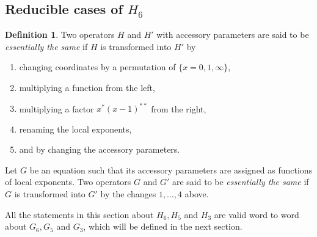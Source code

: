 \documentclass[a4paper,12pt]{article}
\theoremstyle{definition}
\newtheorem{dfn}[thm]{Definition}
\theoremstyle{remark}
\numberwithin{equation}{section} %
\newcommand{\blue}[1]{\textcolor{black}{#1}}
\begin{document}
\subsection{Reducible cases of $H_6$}
\begin{dfn}
  Two operators $H$ and $H'$ with accessory parameters are said to be {\it essentially the same} if $H$ is transformed into $H'$ by
  \begin{enumerate}
  \item changing coordinates by a permutation of $\{x=0,1,\infty\}$,
  \item multiplying a function from the left,
  \item multiplying a factor  $x^*(x-1)^{**}$ from the right,
  \item renaming the local exponents,%
    \item and by changing the accessory parameters.
  \end{enumerate}%
  Let $G$ be an equation such that its accessory parameters are assigned as functions of local exponents. Two operators $G$ and $G'$ are said to be {\it essentially the same} if $G$ is transformed into $G'$ by the changes $1,\dots,4$ above.%
\end{dfn}
All the statements in this section about $H_6, H_5$ and $H_3$ are valid word to word about $G_6, G_5$ and $G_3$, which will be defined in the next section.
\end{document}
